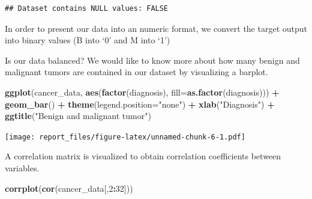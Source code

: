 \documentclass[
]{article}
\newenvironment{Shaded}{\begin{snugshade}}{\end{snugshade}}
\newcommand{\DataTypeTok}[1]{\textcolor[rgb]{0.13,0.29,0.53}{#1}}
\newcommand{\DecValTok}[1]{\textcolor[rgb]{0.00,0.00,0.81}{#1}}
\newcommand{\KeywordTok}[1]{\textcolor[rgb]{0.13,0.29,0.53}{\textbf{#1}}}
\newcommand{\NormalTok}[1]{#1}
\newcommand{\OperatorTok}[1]{\textcolor[rgb]{0.81,0.36,0.00}{\textbf{#1}}}
\newcommand{\StringTok}[1]{\textcolor[rgb]{0.31,0.60,0.02}{#1}}
\begin{document}
\begin{verbatim}
## Dataset contains NULL values: FALSE
\end{verbatim}

In order to present our data into an numeric format, we convert the
target output into binary values (B into `0' and M into `1')

\begin{Shaded}
\end{Shaded}

Is our data balanced? We would like to know more about how many benign
and malignant tumors are contained in our dataset by visualizing a
barplot.

\begin{Shaded}
\begin{Highlighting}[]
\KeywordTok{ggplot}\NormalTok{(cancer_data, }\KeywordTok{aes}\NormalTok{(}\KeywordTok{factor}\NormalTok{(diagnosis), }\DataTypeTok{fill=}\KeywordTok{as.factor}\NormalTok{(diagnosis))) }\OperatorTok{+}
\StringTok{      }\KeywordTok{geom_bar}\NormalTok{() }\OperatorTok{+}\StringTok{ }\KeywordTok{theme}\NormalTok{(}\DataTypeTok{legend.position=}\StringTok{"none"}\NormalTok{) }\OperatorTok{+}\StringTok{ }\KeywordTok{xlab}\NormalTok{(}\StringTok{"Diagnosis"}\NormalTok{) }\OperatorTok{+}
\StringTok{      }\KeywordTok{ggtitle}\NormalTok{(}\StringTok{"Benign and malignant tumor"}\NormalTok{)}
\end{Highlighting}
\end{Shaded}

\texttt{[image: report\_files/figure-latex/unnamed-chunk-6-1.pdf]}

A correlation matrix is visualized to obtain correlation coefficients
between variables.

\begin{Shaded}
\begin{Highlighting}[]
\KeywordTok{corrplot}\NormalTok{(}\KeywordTok{cor}\NormalTok{(cancer_data[,}\DecValTok{2}\OperatorTok{:}\DecValTok{32}\NormalTok{]))}
\end{Highlighting}
\end{Shaded}
\end{document}
